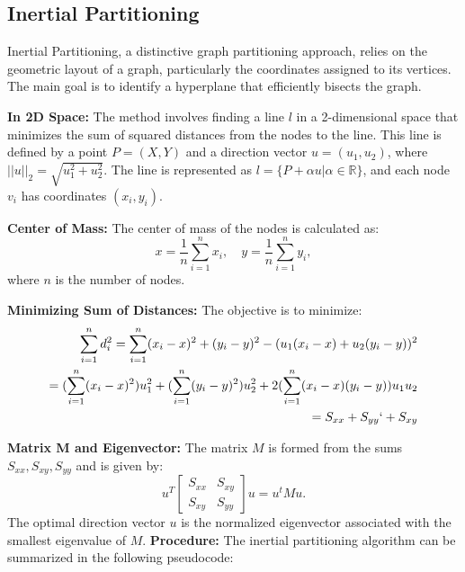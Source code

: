 \documentclass[unicode,11pt,a4paper,oneside,numbers=endperiod,openany]{scrartcl}
\begin{document}
\subsection{Inertial Partitioning}

Inertial Partitioning, a distinctive graph partitioning approach, relies on the geometric layout of a graph, particularly the coordinates assigned to its vertices. The main goal is to identify a hyperplane that efficiently bisects the graph.

\textbf{In 2D Space:}
The method involves finding a line \( l \) in a 2-dimensional space that minimizes the sum of squared distances from the nodes to the line. This line is defined by a point \( P = (X, Y) \) and a direction vector \( u = (u_1, u_2) \), where \( ||u||_2 = \sqrt{u_1^2 + u_2^2} \). The line is represented as \( l = \{P + \alpha u | \alpha \in \mathbb{R}\} \), and each node \( v_i \) has coordinates \( (x_i, y_i) \).

\textbf{Center of Mass:}
The center of mass of the nodes is calculated as:
\begin{equation}
 x = \frac{1}{n}\sum_{i=1}^{n}x_{i}, \quad  y = \frac{1}{n}\sum_{i=1}^{n}y_{i},
\end{equation}
where \( n \) is the number of nodes.

\textbf{Minimizing Sum of Distances:}
The objective is to minimize:
\begin{equation}
\begin{aligned}
 \sum_{i=1}^n d^2_i = \sum^n_{i=1}(x_i - x)^2 +(y_i -y)^2 -(u_1(x_i-x) + u_2(y_i-y))^2\\
 =  (\sum^n_{i=1}(x_i-x)^2)u^2_1+(\sum^n_{i=1}(y_i-y)^2)u^2_2+2(\sum^n_{i=1}(x_i-x)(y_i-y))u_1u_2\\
 = S_{xx}+ S_{yy} `+ S_{xy}
 \end{aligned}
\end{equation}

\textbf{Matrix M and Eigenvector:}
The matrix \( M \) is formed from the sums \( S_{xx}, S_{xy}, S_{yy} \) and is given by:
\begin{equation}
 u^T \begin{bmatrix}
           S_{xx} & S_{xy} \\
           S_{xy} & S_{yy}
 \end{bmatrix} u = u^t Mu.
\end{equation}
The optimal direction vector \( u \) is the normalized eigenvector associated with the smallest eigenvalue of \( M \).
\textbf{Procedure:}
The inertial partitioning algorithm can be summarized in the following pseudocode:
\end{document}
